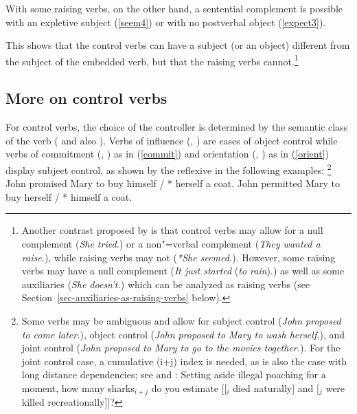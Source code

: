 With some raising verbs, on the other hand, a sentential complement is possible with an expletive
subject (\ref{seem4}) or with no postverbal object (\ref{expect3}). 

\eal
{}
\zl

\noindent
This shows that the control verbs can have a subject (or an object) different from the subject of
the embedded verb, but that the raising verbs cannot.\footnote{%
  Another contrast proposed by
  is that control verbs may allow for a null complement (\emph{She tried.}) or
  a non"=verbal complement (\emph{They wanted a raise.}), while raising verbs may not (\emph{*She
    seemed.}). However, some raising verbs may have a null complement (\emph{It just
    started} (\emph{to rain}).) as well as some auxiliaries (\emph{She doesn't.}) which can be analyzed as raising verbs (see
  Section~\ref{sec-auxiliaries-as-raising-verbs} below).%
} 

\subsection{More on control verbs}

For control verbs, the choice of the controller is determined by the semantic class of the verb
(\citealt[Chapter~3]{PollardandSag1994} and also \citealt{JackendoffandCulicover2003}).  Verbs of
influence (, ) are cases of object control while verbs of commitment
(, ) as in (\ref{commit}) and orientation (, ) as in
(\ref{orient}) display subject control, as shown by the reflexive in the following examples:%
\footnote{Some verbs may be ambiguous and allow for subject control (\emph{John proposed to come
    later.}), object control (\emph{John proposed to Mary to wash herself.}), and joint
  control (\emph{John proposed to Mary to go to the movies together.}). For the joint control case, a cumulative
  (i+j) index is needed, as is also the case with long distance dependencies; see
   and \crossrefchapterw[\pageref{ex:UDC:31}]{udc}:
\ea
Setting aside illegal poaching for a moment, how many sharks$_{i+j}$ do you estimate [[$_i$ died
naturally] and [$_j$ were killed recreationally]]?
\zlast
}
\eal
\ex\label{ex-John-promised-Mary-to-buy}
John promised Mary to buy himself / * herself a coat. \label{commit}
\ex\label{ex-John-permitted-Mary-to-buy} 
John permitted Mary to buy herself / * himself a coat.\label{orient}
\zl
 
